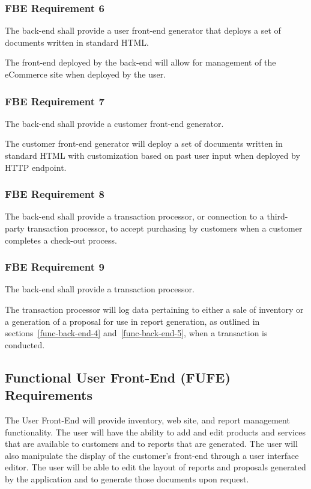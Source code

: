 \documentclass{article}
\begin{document}
\subsubsection{FBE Requirement 6}
\label{func-back-end-6}

The back-end shall provide a user front-end generator that deploys a set of
documents written in standard HTML.

The front-end deployed by the back-end will allow for management of the
eCommerce site when deployed by the user.

\subsubsection{FBE Requirement 7}
\label{func-back-end-7}

The back-end shall provide a customer front-end generator.

The customer front-end generator will deploy a set of documents written in
standard HTML with customization based on past user input when deployed by
HTTP endpoint.

\subsubsection{FBE Requirement 8}
\label{func-back-end-8}

The back-end shall provide a transaction processor, or connection to a
third-party transaction processor, to accept purchasing by customers
when a customer completes a check-out process.

\subsubsection{FBE Requirement 9}
\label{func-back-end-9}

The back-end shall provide a transaction processor.

The transaction processor will log data pertaining to either a sale of inventory
or a generation of a proposal for use in report generation, as outlined in
sections~\ref{func-back-end-4} and~\ref{func-back-end-5}, when a transaction
is conducted.

\pagebreak
\subsection{Functional User Front-End (FUFE) Requirements}

The User Front-End will provide inventory, web site, and report management
functionality.  The user will have the ability to add and edit products and
services that are available to customers and to reports that are generated.  The
user will also manipulate the display of the customer's front-end through a
user interface editor.  The user will be able to edit the layout of reports and
proposals generated by the application and to generate those documents upon
request.
\end{document}
